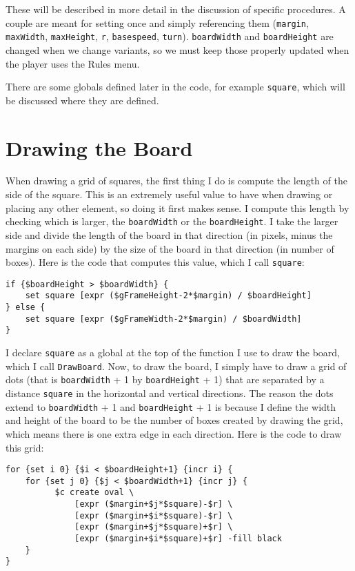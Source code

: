 \documentclass{article}
\begin{document}
These will be described in more detail in the discussion of specific procedures. A couple are meant for setting once and simply referencing them (\texttt{margin}, \texttt{maxWidth}, \texttt{maxHeight}, \texttt{r}, \texttt{basespeed}, \texttt{turn}). \texttt{boardWidth} and \texttt{boardHeight} are changed when we change variants, so we must keep those properly updated when the player uses the Rules menu.

There are some globals defined later in the code, for example \texttt{square}, which will be discussed where they are defined.


\section{Drawing the Board}

When drawing a grid of squares, the first thing I do is compute the length of the side of the square. This is an extremely useful value to have when drawing or placing any other element, so doing it first makes sense. I compute this length by checking which is larger, the \texttt{boardWidth} or the \texttt{boardHeight}. I take the larger side and divide the length of the board in that direction (in pixels, minus the margins on each side) by the size of the board in that direction (in number of boxes). Here is the code that computes this value, which I call \texttt{square}:

\begin{verbatim}
if {$boardHeight > $boardWidth} {
    set square [expr ($gFrameHeight-2*$margin) / $boardHeight]
} else {
    set square [expr ($gFrameWidth-2*$margin) / $boardWidth]
}
\end{verbatim}

I declare \texttt{square} as a global at the top of the function I use to draw the board, which I call \texttt{DrawBoard}. Now, to draw the board, I simply have to draw a grid of dots (that is \texttt{boardWidth} + 1 by \texttt{boardHeight} + 1) that are separated by a distance \texttt{square} in the horizontal and vertical directions. The reason the dots extend to \texttt{boardWidth} + 1 and \texttt{boardHeight} + 1 is because I define the width and height of the board to be the number of boxes created by drawing the grid, which means there is one extra edge in each direction. Here is the code to draw this grid:

\begin{verbatim}
for {set i 0} {$i < $boardHeight+1} {incr i} {
    for {set j 0} {$j < $boardWidth+1} {incr j} {
	      $c create oval \
	          [expr ($margin+$j*$square)-$r] \
	          [expr ($margin+$i*$square)-$r] \
	          [expr ($margin+$j*$square)+$r] \
	          [expr ($margin+$i*$square)+$r] -fill black
    }
}
\end{verbatim}
\end{document}
